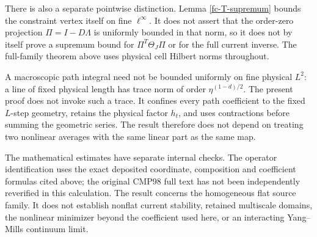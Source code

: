 There is also a separate pointwise distinction. Lemma
\ref{fc-T-supremum} bounds the constraint vertex itself on fine
$\ell^\infty$. It does not assert that the order-zero projection
$\Pi=I-D\Lambda$ is uniformly bounded in that norm, so it does not
by itself prove a supremum bound for $\Pi^T\Theta_J\Pi$ or for the
full current inverse. The full-family theorem above uses physical
cell Hilbert norms throughout.

A macroscopic path integral need not be bounded uniformly on fine
physical $L^2$: a line of fixed physical length has trace norm of
order $\eta^{(1-d)/2}$. The present proof does not invoke such a
trace. It confines every path coefficient to the fixed $L$-step
geometry, retains the physical factor $h_t$, and uses contractions
before summing the geometric series. The result therefore does not
depend on treating two nonlinear averages with the same linear
part as the same map.

The mathematical estimates have separate internal checks. The
operator identification uses the exact deposited coordinate,
composition and coefficient formulas cited above; the original
CMP98 full text has not been independently reverified in this
calculation. The result concerns the homogeneous flat source
family. It does not establish nonflat current stability, retained
multiscale domains, the nonlinear minimizer beyond the coefficient
used here, or an interacting Yang--Mills continuum limit.
